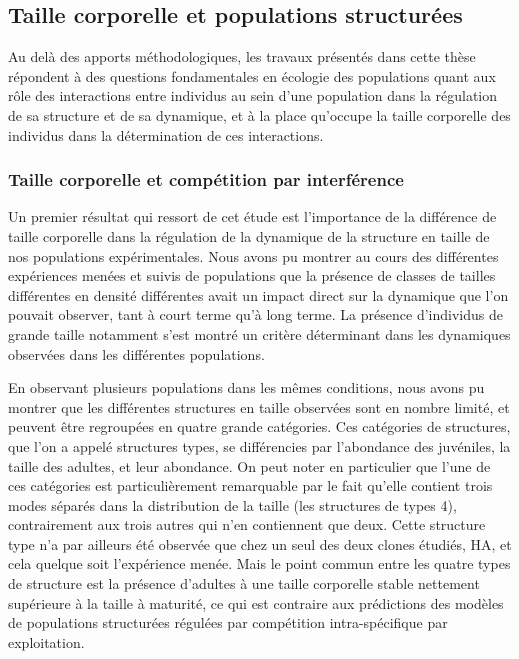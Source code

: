 \subsection{Taille corporelle et populations structurées}

Au delà des apports méthodologiques, les travaux présentés dans cette thèse
répondent à des questions fondamentales en écologie des populations quant aux
rôle des interactions entre individus au sein d'une population dans la
régulation de sa structure et de sa dynamique, et à la place qu'occupe la taille
corporelle des individus dans la détermination de ces interactions.

\subsubsection{Taille corporelle et compétition par interférence}

Un premier résultat qui ressort de cet étude est l'importance de la différence
de taille corporelle dans la régulation de la dynamique de la structure en
taille de nos populations expérimentales. Nous avons pu montrer au cours des
différentes expériences menées et suivis de populations que la présence de
classes de tailles différentes en densité différentes avait un impact direct sur
la dynamique que l'on pouvait observer, tant à court terme qu'à long terme. La
présence d'individus de grande taille notamment s'est montré un critère
déterminant dans les dynamiques observées dans les différentes populations. 

En observant plusieurs populations dans les mêmes conditions, nous avons pu
montrer que les différentes structures en taille observées sont en nombre
limité, et peuvent être regroupées en quatre grande catégories. Ces catégories
de structures, que l'on a appelé structures types, se différencies par
l'abondance des juvéniles, la taille des adultes, et leur abondance. On peut
noter en particulier que l'une de ces catégories est particulièrement
remarquable par le fait qu'elle contient trois modes séparés dans la
distribution de la taille (les structures de types 4), contrairement aux trois
autres qui n'en contiennent que deux. Cette structure type n'a par ailleurs été
observée que chez un seul des deux clones étudiés, HA, et cela quelque soit
l'expérience menée. Mais le point commun entre les quatre types de structure est
la présence d'adultes à une taille corporelle stable nettement supérieure à la
taille à maturité, ce qui est contraire aux prédictions des modèles de
populations structurées régulées par compétition intra-spécifique par
exploitation. 

